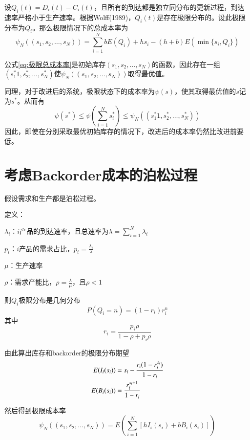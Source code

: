 设$Q_i(t)=D_i(t)-C_i(t)$，且所有的到达都是独立同分布的更新过程，到达速率严格小于生产速率。根据Wolff(1989)，$Q_i(t)$是存在极限分布的。设此极限分布为$Q_i$。那么极限情况下的总成本率为
\begin{equation}
\psi_N((s_1,s_2,\ldots,s_N)) = \sum_{i=1}^NbE(Q_i) + hs_i - (h+b)E(\min\{s_i,Q_i\})
\label{eq:极限总成本率}
\end{equation}

公式\ref{eq:极限总成本率}是初始库存$(s_1,s_2,\ldots,s_N)$的函数，因此存在一组$(s_1^*1,s_2^*,\ldots,s_N^*)$使$\psi_N((s_1,s_2,\ldots,s_N))$取得最优值。

同理，对于改进后的系统，极限状态下的成本率为$\psi(s)$，使其取得最优值的$s$记为$s^*$。从而有
\begin{equation}
\psi(s^*) \leq \psi(\sum_{i=1}^Ns_i^*) \leq \psi_N((s_1^*1,s_2^*,\ldots,s_N^*))
\end{equation}
因此，即使在分别采取最优初始库存的情况下，改进后的成本率仍然比改进前要低。









\section{考虑Backorder成本的泊松过程}

假设需求和生产都是泊松过程。

定义：

$\lambda_i$：$i$产品的到达速率，且总速率为$\lambda=\sum_{i=1}^N\lambda_i$

$p_i$：$i$产品的需求占比，$p_i=\frac{\lambda_i}{\lambda}$

$\mu$：生产速率

$\rho$：需求产能比，$\rho = \frac{\lambda}{\mu}$，且$\rho<1$

则$Q_i$极限分布是几何分布
\[
P(Q_i=n)=(1-r_i)r_i^n
\]
其中
\[
r_i = \frac{p_i\rho}{1-\rho+p_i\rho}
\]

由此算出库存和backorder的极限分布期望
\begin{align}
E(I_i(s_i)) &= s_i - \frac{r_i(1-r_i^{s_i})}{1-r_i} \notag\\
E(B_i(s_i)) &= \frac{r_i^{s_i+1}}{1-r_i} \notag 
\end{align}

然后得到极限成本率
\begin{equation}
\psi_N((s_1,s_2,\ldots,s_N)) = E\left(\sum_{i=1}^N[hI_i(s_i)+bB_i(s_i)]\right)
\label{eq:极限成本率}
\end{equation}

